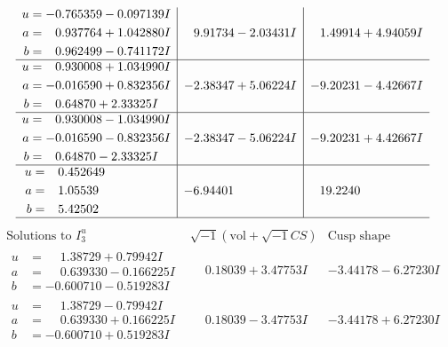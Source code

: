 \documentclass[1p]{elsarticle_modified}
\theoremstyle{definition}
\newcommand{\I}{\sqrt{-1}}
\begin{document}
$$\begin{array}{c|c|c}
\begin{aligned}
u &= -0.765359 - 0.097139 I \\
a &= \phantom{-}0.937764 + 1.042880 I \\
b &= \phantom{-}0.962499 - 0.741172 I\end{aligned}
 & \phantom{-}9.91734 - 2.03431 I & \phantom{-}1.49914 + 4.94059 I \\ \hline\begin{aligned}
u &= \phantom{-}0.930008 + 1.034990 I \\
a &= -0.016590 + 0.832356 I \\
b &= \phantom{-}0.64870 + 2.33325 I\end{aligned}
 & -2.38347 + 5.06224 I & -9.20231 - 4.42667 I \\ \hline\begin{aligned}
u &= \phantom{-}0.930008 - 1.034990 I \\
a &= -0.016590 - 0.832356 I \\
b &= \phantom{-}0.64870 - 2.33325 I\end{aligned}
 & -2.38347 - 5.06224 I & -9.20231 + 4.42667 I \\ \hline\begin{aligned}
u &= \phantom{-}0.452649\phantom{ +0.000000I} \\
a &= \phantom{-}1.05539\phantom{ +0.000000I} \\
b &= \phantom{-}5.42502\phantom{ +0.000000I}\end{aligned}
 & -6.94401\phantom{ +0.000000I} & \phantom{-}19.2240\phantom{ +0.000000I}\\
 \hline 
 \end{array}$$\newpage$$\begin{array}{c|c|c}  
\text{Solutions to }I^u_{3}& \I (\text{vol} + \sqrt{-1}CS) & \text{Cusp shape}\\
 \hline 
\begin{aligned}
u &= \phantom{-}1.38729 + 0.79942 I \\
a &= \phantom{-}0.639330 - 0.166225 I \\
b &= -0.600710 - 0.519283 I\end{aligned}
 & \phantom{-}0.18039 + 3.47753 I & -3.44178 - 6.27230 I \\ \hline\begin{aligned}
u &= \phantom{-}1.38729 - 0.79942 I \\
a &= \phantom{-}0.639330 + 0.166225 I \\
b &= -0.600710 + 0.519283 I\end{aligned}
 & \phantom{-}0.18039 - 3.47753 I & -3.44178 + 6.27230 I \\ \hline\begin{aligned}

\end{aligned}
\end{array}$$
\end{document}

